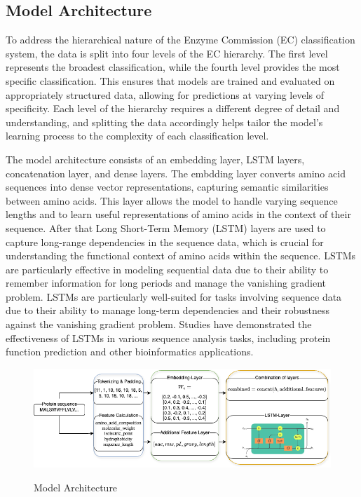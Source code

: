 \subsection{Model Architecture}
\label{sec:Model Architecture}

To address the hierarchical nature of the Enzyme Commission (EC) classification system, the data is split into four levels of the EC hierarchy. The first level represents the broadest classification, while the fourth level provides the most specific classification. This ensures that models are trained and evaluated on appropriately structured data, allowing for predictions at varying levels of specificity. Each level of the hierarchy requires a different degree of detail and understanding, and splitting the data accordingly helps tailor the model's learning process to the complexity of each classification level.

The model architecture consists of an embedding layer, LSTM layers, concatenation layer, and dense layers. The embdding layer converts amino acid sequences into dense vector representations, capturing semantic similarities between amino acids. This layer allows the model to handle varying sequence lengths and to learn useful representations of amino acids in the context of their sequence. After that Long Short-Term Memory (LSTM) layers are used to capture long-range dependencies in the sequence data, which is crucial for understanding the functional context of amino acids within the sequence. LSTMs are particularly effective in modeling sequential data due to their ability to remember information for long periods and manage the vanishing gradient problem. LSTMs are particularly well-suited for tasks involving sequence data due to their ability to manage long-term dependencies and their robustness against the vanishing gradient problem. Studies have demonstrated the effectiveness of LSTMs in various sequence analysis tasks, including protein function prediction and other bioinformatics applications.\autocite{liuAttentionMechanismEnhanced2019} \autocite{zhangEncoderdecoderModelsSequencetosequence2023}

\begin{figure}[hbt]
    \centering
    \begin{minipage}[t]{\textwidth}
    \caption{Model Architecture}
    \includegraphics[width=1\textwidth]{img/Model-Architecture.drawio.png}
    \label{fig:model-architecture}
    \end{minipage}
\end{figure}


